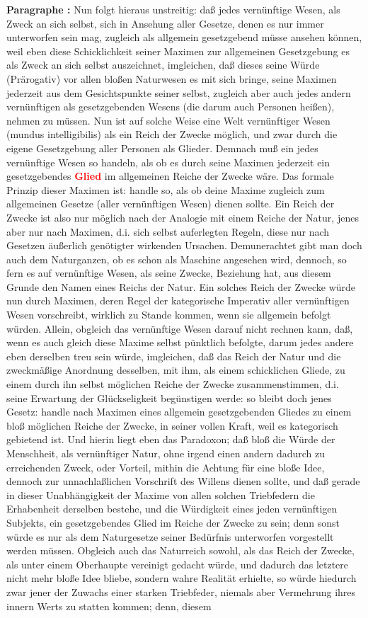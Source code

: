 \documentclass[a4paper,12pt,twoside]{book}
\newcommand{\match}[1]{\textcolor{red}{\textbf{#1}}}
\begin{document}
	\noindent\textbf{Paragraphe : }Nun folgt hieraus unstreitig: daß jedes vernünftige Wesen, als Zweck an sich selbst, sich in Ansehung aller Gesetze, denen es nur immer unterworfen sein mag, zugleich als allgemein gesetzgebend müsse ansehen können, weil eben diese Schicklichkeit seiner Maximen zur allgemeinen Gesetzgebung es als Zweck an sich selbst auszeichnet, imgleichen, daß dieses seine Würde (Prärogativ) vor allen bloßen Naturwesen es mit sich bringe, seine Maximen jederzeit aus dem Gesichtspunkte seiner selbst, zugleich aber auch jedes andern vernünftigen als gesetzgebenden Wesens (die darum auch Personen heißen), nehmen zu müssen. Nun ist auf solche Weise eine Welt vernünftiger Wesen (mundus intelligibilis) als ein Reich der Zwecke möglich, und zwar durch die eigene Gesetzgebung aller Personen als Glieder. Demnach muß ein jedes vernünftige Wesen so handeln, als ob es durch seine Maximen jederzeit ein gesetzgebendes \match{Glied} im allgemeinen Reiche der Zwecke wäre. Das formale Prinzip dieser Maximen ist: handle so, als ob deine Maxime zugleich zum allgemeinen Gesetze (aller vernünftigen Wesen) dienen sollte. Ein Reich der Zwecke ist also nur möglich nach der Analogie mit einem Reiche der Natur, jenes aber nur nach Maximen, d.i. sich selbst auferlegten Regeln, diese nur nach Gesetzen äußerlich genötigter wirkenden Ursachen. Demunerachtet gibt man doch auch dem Naturganzen, ob es schon als Maschine angesehen wird, dennoch, so fern es auf vernünftige Wesen, als seine Zwecke, Beziehung hat, aus diesem Grunde den Namen eines Reichs der Natur. Ein solches Reich der Zwecke würde nun durch Maximen, deren Regel der kategorische Imperativ aller vernünftigen Wesen vorschreibt, wirklich zu Stande kommen, wenn sie allgemein befolgt würden. Allein, obgleich das vernünftige Wesen darauf nicht rechnen kann, daß, wenn es auch gleich  diese Maxime selbst pünktlich befolgte, darum jedes andere eben derselben treu sein würde, imgleichen, daß das Reich der Natur und die zweckmäßige Anordnung desselben, mit ihm, als einem schicklichen Gliede, zu einem durch ihn selbst möglichen Reiche der Zwecke zusammenstimmen, d.i. seine Erwartung der Glückseligkeit begünstigen werde: so bleibt doch jenes Gesetz: handle nach Maximen eines allgemein gesetzgebenden Gliedes zu einem bloß möglichen Reiche der Zwecke, in seiner vollen Kraft, weil es kategorisch gebietend ist. Und hierin liegt eben das Paradoxon; daß bloß die Würde der Menschheit, als vernünftiger Natur, ohne irgend einen andern dadurch zu erreichenden Zweck, oder Vorteil, mithin die Achtung für eine bloße Idee, dennoch zur unnachlaßlichen Vorschrift des Willens dienen sollte, und daß gerade in dieser Unabhängigkeit der Maxime von allen solchen Triebfedern die Erhabenheit derselben bestehe, und die Würdigkeit eines jeden vernünftigen Subjekts, ein gesetzgebendes Glied im Reiche der Zwecke zu sein; denn sonst würde es nur als dem Naturgesetze seiner Bedürfnis unterworfen vorgestellt werden müssen. Obgleich auch das Naturreich sowohl, als das Reich der Zwecke, als unter einem Oberhaupte vereinigt gedacht würde, und dadurch das letztere nicht mehr bloße Idee bliebe, sondern wahre Realität erhielte, so würde hiedurch zwar jener der Zuwachs einer starken Triebfeder, niemals aber Vermehrung ihres innern Werts zu statten kommen; denn, diesem 
\end{document}
